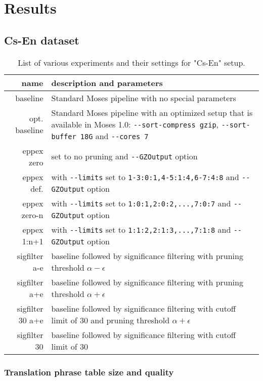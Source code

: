 \chapter{Results}
\label{chap:results}

\section{Cs-En dataset}

\begin{table}[ht]
\centering
\begin{tabular}{ r p{10cm} }
name & description and parameters \\
\hline
\hline
baseline        & Standard Moses pipeline with no special parameters \\
opt. baseline   & Standard Moses pipeline with an optimized setup that is
available in Moses 1.0:
\verb|--sort-compress gzip|, \verb|--sort-buffer 18G| and \verb|--cores 7| \\
eppex zero      & \eppex{} set to no pruning and \verb|--GZOutput| option \\
eppex def.      & \eppex{} with \verb|--limits| set to \verb|1-3:0:1,4-5:1:4,6-7:4:8| and \verb|--GZOutput| option \\
eppex zero-n    & \eppex{} with \verb|--limits| set to \verb|1:0:1,2:0:2,...,7:0:7| and \verb|--GZOutput| option \\
eppex 1:n+1     & \eppex{} with \verb|--limits| set to \verb|1:1:2,2:1:3,...,7:1:8| and \verb|--GZOutput| option \\
sigfilter a-e   & baseline followed by significance filtering with pruning threshold $\alpha - \epsilon$ \\
sigfilter a+e   & baseline followed by significance filtering with pruning threshold $\alpha + \epsilon$ \\
sigfilter 30 a+e  & baseline followed by significance filtering with cutoff limit of 30 and pruning threshold $\alpha + \epsilon$ \\
sigfilter 30    & baseline followed by significance filtering with cutoff limit of 30 \\
\hline
\hline
\end{tabular}
\caption{\label{cs-en-wmt13-scenarios}
List of various experiments and their settings for "Cs-En" setup.}
\end{table}

\subsection{Translation phrase table size and quality}

